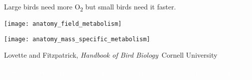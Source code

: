 \documentclass[t]{beamer}
\begin{document}
\begin{frame}[t,plain]{Large birds need more O\textsubscript{2} but small birds need it faster.}

	\vspace{-\baselineskip}
	
	\begin{multicols}{2}
	
	\centering
	\texttt{[image: anatomy\_field\_metabolism]} 
	
	\columnbreak
	
	\texttt{[image: anatomy\_mass\_specific\_metabolism]}
	
	\end{multicols}

	\vfilll
	
	\tiny \hfill Lovette and Fitzpatrick, \textit{Handbook of Bird Biology} \textcopyright\,Cornell University

\end{frame}

{
\begin{frame}[b,plain]{\textcolor{white}{Fats and carbs are main energy sources.}}
	\tiny \hfill\textcolor{white}{Baltimore Oriole by Michael S.~Taylor, }
\end{frame}
}
\end{document}
